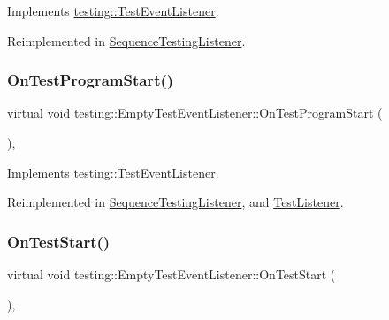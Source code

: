 Implements \hyperlink{classtesting_1_1_test_event_listener_ad15b6246d94c268e233487a86463ef3d}{testing\+::\+Test\+Event\+Listener}.



Reimplemented in \hyperlink{class_sequence_testing_listener_aacac5e15bac089460841ff63a5c31f57}{Sequence\+Testing\+Listener}.

\mbox{\label{classtesting_1_1_empty_test_event_listener_aa3847c8a3c22d8d69a6006dfdd6589fc}} 
\subsubsection{\texorpdfstring{On\+Test\+Program\+Start()}{OnTestProgramStart()}}
{\footnotesize\ttfamily virtual void testing\+::\+Empty\+Test\+Event\+Listener\+::\+On\+Test\+Program\+Start (\begin{DoxyParamCaption}\item[{const \hyperlink{classtesting_1_1_unit_test}{Unit\+Test} \&}]{ }\end{DoxyParamCaption})\hspace{0.3cm}{\ttfamily [inline]}, {\ttfamily [virtual]}}



Implements \hyperlink{classtesting_1_1_test_event_listener_a5f6c84f39851e8a603a2d2e10063816b}{testing\+::\+Test\+Event\+Listener}.



Reimplemented in \hyperlink{class_sequence_testing_listener_a25b96acdbaa6f582e583e6b56bd39b42}{Sequence\+Testing\+Listener}, and \hyperlink{class_test_listener_a6218f522f5b6b37050ff0ea630ac5fd3}{Test\+Listener}.

\mbox{\label{classtesting_1_1_empty_test_event_listener_a84fa74cc9ba742f9f847ea405ca84e5e}} 
\subsubsection{\texorpdfstring{On\+Test\+Start()}{OnTestStart()}}
{\footnotesize\ttfamily virtual void testing\+::\+Empty\+Test\+Event\+Listener\+::\+On\+Test\+Start (\begin{DoxyParamCaption}\item[{const \hyperlink{classtesting_1_1_test_info}{Test\+Info} \&}]{ }\end{DoxyParamCaption})\hspace{0.3cm}{\ttfamily [inline]}, {\ttfamily [virtual]}}



